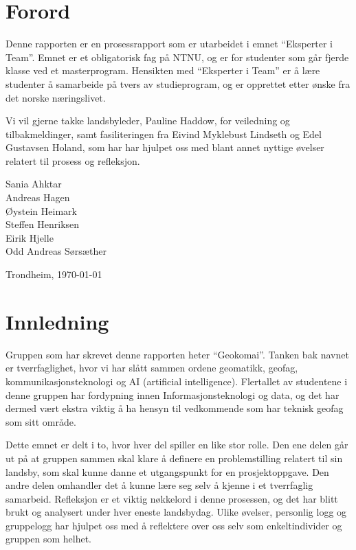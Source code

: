 \documentclass[a4paper,norsk,oneside]{article}
\newcommand{\thesisAuthor}{Sania Ahktar\\Andreas Hagen\\Øystein Heimark\\Steffen Henriksen\\Eirik Hjelle\\Odd Andreas Sørsæther}
\begin{document}
\section*{Forord}



\vspace{1cm}

Denne rapporten er en prosessrapport som er utarbeidet i emnet “Eksperter i Team”. Emnet er et obligatorisk fag på NTNU, og er for studenter som går fjerde klasse ved et masterprogram. Hensikten med “Eksperter i Team” er å lære studenter å samarbeide på tvers av studieprogram, og er opprettet etter ønske fra det norske næringslivet.

Vi vil gjerne takke landsbyleder, Pauline Haddow, for veiledning og tilbakmeldinger, samt fasiliteringen fra Eivind Myklebust Lindseth og Edel Gustavsen Holand, som har har hjulpet oss med blant annet nyttige øvelser relatert til prosess og refleksjon. 





\vfill

\noindent
\thesisAuthor

\hfill Trondheim, \today
\cleardoublepage

\tableofcontents

\clearpage

\section{Innledning}
Gruppen som har skrevet denne rapporten heter “Geokomai”. Tanken bak navnet er tverrfaglighet, hvor vi har slått sammen ordene geomatikk, geofag,  kommunikasjonsteknologi og AI (artificial intelligence). Flertallet av studentene i denne gruppen har fordypning innen Informasjonsteknologi og data, og det har dermed vært ekstra viktig å ha hensyn til vedkommende som har teknisk geofag som sitt område.

Dette emnet er delt i to, hvor hver del spiller en like stor rolle. Den ene delen går ut på at gruppen sammen skal klare å definere en problemstilling relatert til sin landsby, som skal kunne danne et utgangspunkt for en prosjektoppgave. Den andre delen omhandler det å kunne lære seg selv å kjenne i et tverrfaglig samarbeid. Refleksjon er et viktig nøkkelord i denne prosessen, og det har blitt brukt og analysert under hver eneste landsbydag. Ulike øvelser, personlig logg og gruppelogg har hjulpet oss med å reflektere over oss selv som enkeltindivider og gruppen som helhet. 
\end{document}
